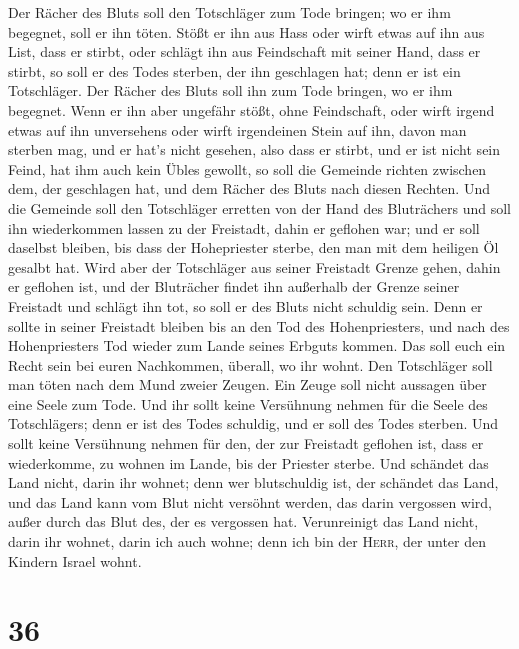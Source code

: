  Der Rächer des Bluts soll den Totschläger zum Tode
bringen; wo er ihm begegnet, soll er ihn töten.  Stößt er
ihn aus Hass oder wirft etwas auf ihn aus List, dass er stirbt,
 oder schlägt ihn aus Feindschaft mit seiner Hand, dass
er stirbt, so soll er des Todes sterben, der ihn geschlagen hat; denn er
ist ein Totschläger. Der Rächer des Bluts soll ihn zum Tode bringen, wo
er ihm begegnet.  Wenn er ihn aber ungefähr stößt, ohne
Feindschaft, oder wirft irgend etwas auf ihn unversehens 
oder wirft irgendeinen Stein auf ihn, davon man sterben mag, und er
hat's nicht gesehen, also dass er stirbt, und er ist nicht sein Feind,
hat ihm auch kein Übles gewollt,  so soll die Gemeinde
richten zwischen dem, der geschlagen hat, und dem Rächer des Bluts nach
diesen Rechten.  Und die Gemeinde soll den Totschläger
erretten von der Hand des Bluträchers und soll ihn wiederkommen lassen
zu der Freistadt, dahin er geflohen war; und er soll daselbst bleiben,
bis dass der Hohepriester sterbe, den man mit dem heiligen Öl gesalbt
hat.  Wird aber der Totschläger aus seiner Freistadt
Grenze gehen, dahin er geflohen ist,  und der Bluträcher
findet ihn außerhalb der Grenze seiner Freistadt und schlägt ihn tot, so
soll er des Bluts nicht schuldig sein.  Denn er sollte in
seiner Freistadt bleiben bis an den Tod des Hohenpriesters, und nach des
Hohenpriesters Tod wieder zum Lande seines Erbguts kommen.
 Das soll euch ein Recht sein bei euren Nachkommen,
überall, wo ihr wohnt.  Den Totschläger soll man töten
nach dem Mund zweier Zeugen. Ein Zeuge soll nicht aussagen über eine
Seele zum Tode.  Und ihr sollt keine Versühnung nehmen
für die Seele des Totschlägers; denn er ist des Todes schuldig, und er
soll des Todes sterben.  Und sollt keine Versühnung
nehmen für den, der zur Freistadt geflohen ist, dass er wiederkomme, zu
wohnen im Lande, bis der Priester sterbe.  Und schändet
das Land nicht, darin ihr wohnet; denn wer blutschuldig ist, der
schändet das Land, und das Land kann vom Blut nicht versöhnt werden, das
darin vergossen wird, außer durch das Blut des, der es vergossen hat.
 Verunreinigt das Land nicht, darin ihr wohnet, darin ich
auch wohne; denn ich bin der \textsc{Herr}, der unter den Kindern Israel
wohnt.

\hypertarget{section-35}{%
\section{36}\label{section-35}}

